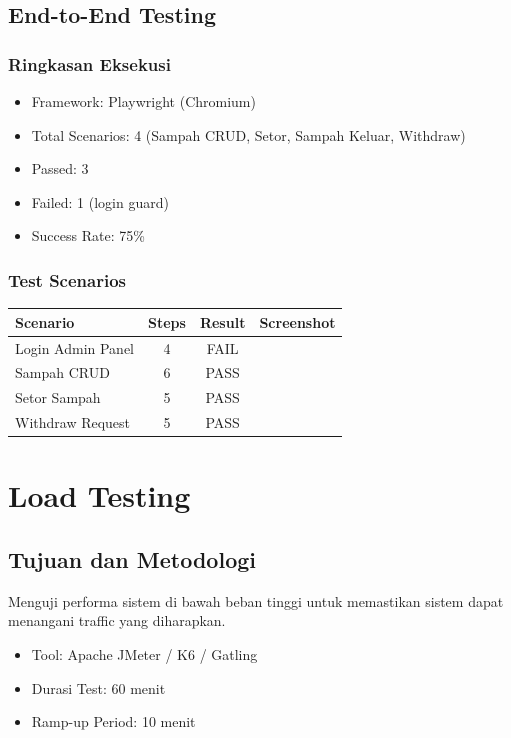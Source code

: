 \documentclass[12pt,a4paper]{article}
\newcommand{\cmark}{\ding{51}}
\begin{document}
\subsection{End-to-End Testing}
\subsubsection{Ringkasan Eksekusi}
\begin{itemize}
  \item Framework: Playwright (Chromium)
  \item Total Scenarios: 4 (Sampah CRUD, Setor, Sampah Keluar, Withdraw)
  \item Passed: 3
  \item Failed: 1 (login guard)
  \item Success Rate: 75\%
\end{itemize}

\subsubsection{Test Scenarios}
\begin{tabularx}{\textwidth}{@{}lccc@{}}
\toprule
Scenario & Steps & Result & Screenshot \\
\midrule
Login Admin Panel & 4 & FAIL & \cmark \\
Sampah CRUD & 6 & PASS & \cmark \\
Setor Sampah & 5 & PASS & \cmark \\
Withdraw Request & 5 & PASS & \cmark \\
\bottomrule
\end{tabularx}

\section{Load Testing}
\subsection{Tujuan dan Metodologi}
Menguji performa sistem di bawah beban tinggi untuk memastikan sistem dapat menangani traffic yang diharapkan.
\begin{itemize}
  \item Tool: Apache JMeter / K6 / Gatling
  \item Durasi Test: 60 menit
  \item Ramp-up Period: 10 menit
\end{itemize}
\end{document}
